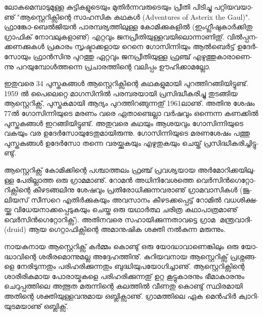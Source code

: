 \vskip 2pt

ലോ­ക­മെ­മ്പാ­ടു­മു­ള്ള കു­ട്ടി­ക­ളു­ടെ­യും മു­തിര്‍­ന്ന­വ­രു­ടെ­യും പ്രീ­തി പി­ടി­ച്ചു പറ്റി­യ­വ­യാ­ണു് "ആ­സ്റ്റെ­റി­ക്സി­ന്റെ സാ­ഹ­സിക 
കഥ­കള്‍ (Adventures of Asterix the Gaul)".  ഫ്രാ­ങ്കോ-ബെല്‍­ജി­യന്‍ പാ­ര­മ്പ­ര്യ­ത്തി­ലു­ള്ള കോ­മി­ക്കു­ക­ളില്‍ 
(ഇം­ഗ്ലീ­ഷു­കാര്‍­ക്കി­തു ഗ്രാ­ഫി­ക് നോ­വ­ലു­ക­ളാ­ണു്) എറ്റ­വും ജന­പ്രീ­തി­യു­ള്ള­വ­യി­ലൊ­ന്നാ­ണി­തു്. വില്‍­പ്പ­ന­ക്ക­ണ­ക്കു­കള്‍ പ്ര­കാ­രം 
സൃ­ഷ്ടാ­ക്ക­ളായ റെ­നെ ഗോ­സി­ന്നി­യും ആല്‍­ബെര്‍­ട്ട് ഉദേര്‍­സോ­യും ഫ്രാന്‍­സി­നു പു­റ­ത്തു ഏറ്റ­വും ജന­പ്രീ­തി­യു­ള്ള ഫ്ര­ഞ്ച് 
എഴു­ത്തു­കാ­രാ­ണെ­ന്നു പറ­യു­മ്പോള്‍­ത്ത­ന്നെ പ്ര­ചാ­ര­ത്തി­ന്റെ വലി­പ്പം ഊഹി­ക്കാ­മ­ല്ലോ.

ഇ­തു­വ­രെ 34 പു­സ്ത­ക­ങ്ങള്‍ ആസ്റ്റെ­റി­ക്സി­ന്റെ കഥ­ക­ളു­മാ­യി പു­റ­ത്തി­റ­ങ്ങി­യി­ട്ടു­ണ്ട്. 1959 ല്‍ പൈ­ലെ­റ്റെ മാ­ഗ­സി­നില്‍ 
പര­മ്പ­ര­യാ­യി പ്ര­സി­ദ്ധീ­ക­രി­ച്ചു തു­ട­ങ്ങിയ ആസ്റ്റെ­റി­ക്സ്, പു­സ്ത­ക­മാ­യി ആദ്യം പു­റ­ത്തി­റ­ങ്ങു­ന്ന­തു് 1961­ലാ­ണു്. അതി­നു 
ശേ­ഷം 77ല്‍ ഗോ­സി­ന്നി­യു­ടെ മര­ണം വരെ ഏതാ­ണ്ടെ­ല്ലാ വര്‍­ഷ­വും ഒന്നെ­ന്ന കണ­ക്കില്‍ പു­സ്ത­ക­ങ്ങള്‍ ഇറ­ങ്ങി­യി­ട്ടു­ണ്ട്. 
അതു­വ­രെ കഥ­യും ആശ­യ­വും ഗോ­സി­ന്നി­യു­ടെ വക­യും വര ഉദേര്‍­സോ­യു­ടേ­തു­മാ­യി­രു­ന്നു. ഗോ­സി­ന്നി­യു­ടെ മര­ണ­ശേ­ഷം 
പത്തു പു­സ്ത­ക­ങ്ങള്‍ ഉദേര്‍­സോ തന്നെ വര­യ്ക്കു­ക­യും എഴു­തു­ക­യും ചെ­യ്ത് പ്ര­സി­ദ്ധീ­ക­രി­ച്ചി­ട്ടു­ണ്ടു്.

ആ­സ്റ്റെ­റി­ക്സ് കോ­മി­ക്കി­ന്റെ പശ്ചാ­ത്ത­ലം ഫ്ര­ഞ്ച് പ്ര­വ­ശ്യ­യായ അര്‍­മോ­റി­ക്ക­യി­ലു­ള്ള പേ­രി­ല്ലാ­ത്ത ഒരു ഗ്രാ­മ­മാ­ണു്. 
റോ­മന്‍ അധി­നി­വേ­ശ­ത്തെ വെര്‍­സിന്‍­ഗെ­റ്റോ­റി­ക്സി­ന്റെ കീ­ഴ­ട­ങ്ങ­ലി­നു ശേ­ഷ­വും പ്ര­തി­രോ­ധി­ക്കു­ന്ന­വ­രാ­ണു് ഗ്രാ­മ­വാ­സി­കള്‍ 
(ജൂ­ലി­യ­സ് സീ­സ­റെ എതിര്‍­ക്കു­ക­യും അവ­സാ­നം കീ­ഴ­ട­ക്ക­പ്പെ­ട്ട് റോ­മില്‍ വധ­ശി­ക്ഷ­യ്ക്കു വി­ധേ­യ­നാ­ക്ക­പ്പെ­ടു­ക­യും ചെ­യ്ത 
ഒരു യഥാര്‍­ത്ഥ ചരി­ത്ര കഥാ­പാ­ത്ര­മാ­ണു് വെര്‍സിന്‍ഗെറ്റോറിക്സ്). അതി­ന­വ­രെ സഹാ­യി­ക്കു­ന്ന­താ­വ­ട്ടെ ഗ്രാമ ­
മ­ന്ത്ര­വാ­ദി­ (druid) ആയ ഗെ­റ്റാ­ഫി­ക്സി­ന്റെ അമാ­നു­ഷിക ശക്തി നല്‍­കു­ന്ന മരു­ന്നും­.

­നാ­യ­ക­നായ ആ­സ്റ്റെ­റി­ക്സ് കര്‍­മ്മം കൊ­ണ്ടു് ഒരു യോ­ദ്ധാ­വാ­ണെ­ങ്കി­ലും ഒരു യോ­ദ്ധാ­വി­ന്റെ ശരീ­ര­മൊ­ന്നു­മ­ല്ല അദ്ദേ­ഹ­ത്തി­നു്. 
കു­റി­യ­വ­നായ ആസ്റ്റെ­റി­ക്സ് പ്ര­ശ്ന­ങ്ങ­ളെ നേ­രി­ടു­ന്ന­തും പരി­ഹ­രി­ക്കു­ന്ന­തും ബു­ദ്ധി­യു­പ­യോ­ഗി­ച്ചാ­ണു്. ആസ്റ്റെ­റി­ക്സി­ന്റെ 
ശാ­രീ­രി­ക­മായ പോ­രാ­യ്മ­ക­ളെ പരി­ഹ­രി­ക്കു­ന്ന­തു് ഉറ്റ കൂ­ട്ടു­കാ­ര­നും ഭീ­മാ­കാ­ര­നും ചെ­റു­പ്പ­ത്തി­ലെ അത്ഭുത മരു­ന്നി­ന്റെ 
കല­ത്തില്‍ വീ­ണ­തു കൊ­ണ്ടു് സ്ഥി­ര­മാ­യി അതി­ന്റെ ശക്തി­യു­ള്ള­വ­നു­മായ ഒബ്ലി­ക്സാ­ണു്. ഗ്രാ­മ­ത്തി­ലെ ഏക മെന്‍­ഹിര്‍ 
ക്വാ­റി­യു­ട­മ­യാ­ണു് ഒബ്ലി­ക്സ്.

